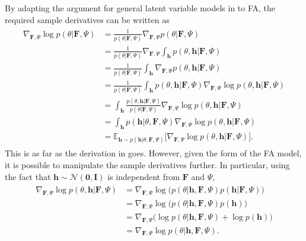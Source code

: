 \documentclass[msc,deptreport.inf]{infthesis} %
\newcommand{\matr}[1]{\mathbf{#1}}
\newcommand{\E}{\mathbb E}
\begin{document}
By adapting the argument for general latent variable models in \cite{barber2007} to FA, the required sample derivatives can be written as
\begin{align}\label{eqn:grad_log_likelihood}
\begin{split}
	\nabla_{\matr{F}, \Psi} \log p(\theta | \matr{F}, \Psi) 
	& = \frac{1}{p(\theta | \matr{F}, \Psi)} \nabla_{\matr{F}, \Psi} p(\theta | \matr{F}, \Psi) \\
	& = \frac{1}{p(\theta | \matr{F}, \Psi)} \nabla_{\matr{F}, \Psi} \int_\matr{h} p(\theta, \matr{h} | \matr{F}, \Psi) \\
	& = \frac{1}{p(\theta | \matr{F}, \Psi)} \int_\matr{h} \nabla_{\matr{F}, \Psi} p(\theta, \matr{h} | \matr{F}, \Psi) \\
	& = \frac{1}{p(\theta | \matr{F}, \Psi)} \int_\matr{h} p(\theta, \matr{h} | \matr{F}, \Psi) \nabla_{\matr{F}, \Psi} \log p(\theta, \matr{h} | \matr{F}, \Psi) \\
	& = \int_\matr{h} \frac{p(\theta, \matr{h} | \matr{F}, \Psi)}{p(\theta | \matr{F}, \Psi)} \nabla_{\matr{F}, \Psi} \log p(\theta, \matr{h} | \matr{F}, \Psi) \\
	& = \int_\matr{h} p(\matr{h} | \theta, \matr{F}, \Psi) \nabla_{\matr{F}, \Psi} \log p(\theta, \matr{h} | \matr{F}, \Psi) \\
	& = \E_{\matr{h} \sim p(\matr{h} | \theta, \matr{F}, \Psi)} \big[ \nabla_{\matr{F}, \Psi} \log p(\theta, \matr{h} | \matr{F}, \Psi) \big].
\end{split}
\end{align}
This is as far as the derivation in \cite{barber2007} goes. However, given the form of the FA model, it is possible to manipulate the sample derivatives further. In particular, using the fact that $\matr{h} \sim \mathcal{N}(\matr{0}, \matr{I})$ is independent from $\matr{F}$ and $\Psi$,
\begin{align}\label{eqn:grad_log_complete_likelihood}
\begin{split}
	\nabla_{\matr{F}, \Psi} \log p(\theta, \matr{h} | \matr{F}, \Psi)
	& = \nabla_{\matr{F}, \Psi} \log \big(p(\theta | \matr{h}, \matr{F}, \Psi)p(\matr{h} | \matr{F}, \Psi)\big) \\
	& = \nabla_{\matr{F}, \Psi} \log \big(p(\theta | \matr{h}, \matr{F}, \Psi)p(\matr{h})\big) \\
	& = \nabla_{\matr{F}, \Psi} \big( \log p(\theta | \matr{h}, \matr{F}, \Psi) + \log p(\matr{h})\big) \\
	& = \nabla_{\matr{F}, \Psi} \log p(\theta | \matr{h}, \matr{F}, \Psi).
\end{split}
\end{align}
\end{document}
